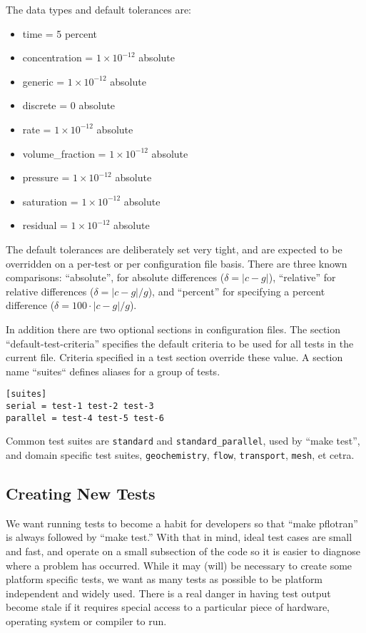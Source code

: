 The data types and default tolerances are:
\begin{itemize}
\item time = 5 percent
\item concentration = $1\times 10^{-12}$ absolute
\item generic = $1\times 10^{-12}$ absolute
\item discrete = 0 absolute
\item rate = $1\times 10^{-12}$ absolute
\item volume\_fraction = $1\times 10^{-12}$ absolute
\item pressure = $1\times 10^{-12}$ absolute
\item saturation = $1\times 10^{-12}$ absolute
\item residual = $1\times 10^{-12}$ absolute
\end{itemize}
The default tolerances are deliberately set very tight, and are
expected to be overridden on a per-test or per configuration file
basis.  There are three known comparisons: ``absolute'', for absolute
differences ($\delta\!=\!|c\!-\!g|$), ``relative'' for relative differences ($\delta\!=\!{|c\!-\!g|}/{g}$), and ``percent''
for specifying a percent difference ($\delta\!=\!100\!\cdot\!{|c\!-\!g|}/{g}$).

In addition there are two optional sections in configuration
files. The section ``default-test-criteria'' specifies the default
criteria to be used for all tests in the current file. Criteria
specified in a test section override these value. A section name
``suites`` defines aliases for a group of tests.
\begin{verbatim}
[suites]
serial = test-1 test-2 test-3
parallel = test-4 test-5 test-6
\end{verbatim}
Common test suites are \texttt{standard} and \texttt{standard\_parallel}, used by
``make test'', and domain specific test suites, \texttt{geochemistry},
\texttt{flow}, \texttt{transport}, \texttt{mesh}, et cetra.

\subsection{Creating New Tests}

We want running tests to become a habit for developers so that ``make
pflotran'' is always followed by ``make test.'' With that in mind, ideal
test cases are small and fast, and operate on a small subsection of
the code so it is easier to diagnose where a problem has
occurred. While it may (will) be necessary to create some platform
specific tests, we want as many tests as possible to be platform
independent and widely used. There is a real danger in having test
output become stale if it requires special access to a particular
piece of hardware, operating system or compiler to run.

